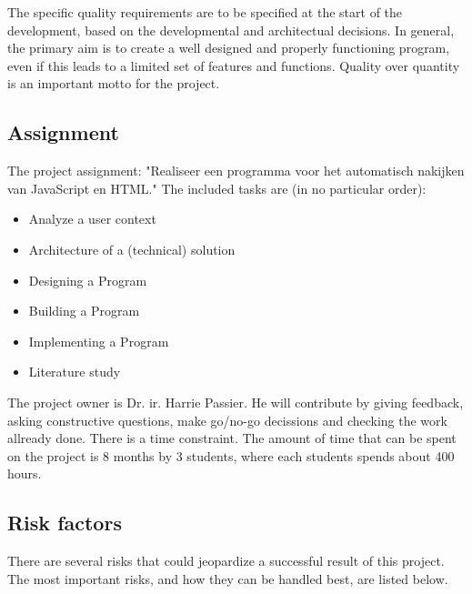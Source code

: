 \documentclass{article}
\begin{document}
The specific quality requirements are to be specified at the start of the
development, based on the developmental and architectual decisions. In general,
the primary aim is to create a well designed and properly functioning program,
even if this leads to a limited set of features and functions. Quality over
quantity is an important motto for the project.

\subsection{Assignment} 

The project assignment: "Realiseer een programma voor het automatisch nakijken 
van JavaScript en HTML." The included tasks are (in no particular order): 

\begin{itemize}
  \item Analyze a user context
  \item Architecture of a (technical) solution
  \item Designing a Program
  \item Building a Program
  \item Implementing a Program
  \item Literature study
\end{itemize}

The project owner is Dr. ir. Harrie Passier. He will contribute by giving
feedback, asking constructive questions, make go/no-go decissions and checking
the work allready done. There is a time constraint. The amount of time that can
be spent on the project is 8 months by 3 students, where each students spends
about 400 hours.

\subsection{Risk factors}

There are several risks that could jeopardize a successful result of this
project. The most important risks, and how they can be handled best, are listed
below.
\end{document}
